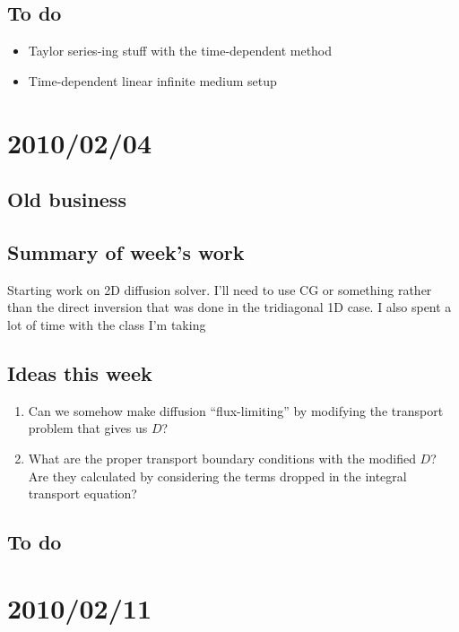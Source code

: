 \documentclass[11pt]{SRJresearch}
\begin{document}
\subsection{To do}
\begin{itemize}
  \item Taylor series-ing stuff with the time-dependent method

  \item Time-dependent linear infinite medium setup
\end{itemize}
\section{2010/02/04}

\subsection{Old business}

\subsection{Summary of week's work}
Starting work on 2D diffusion solver. I'll need to use CG or something rather
than the direct inversion that was done in the tridiagonal 1D case. I also
spent a lot of time with the class I'm taking

\subsection{Ideas this week}
\begin{enumerate}
\item Can we somehow make diffusion ``flux-limiting'' by modifying the transport
problem that gives us $D$?

\item What are the proper transport boundary conditions with the modified $D$?
  Are they calculated by considering the terms dropped in the integral
  transport equation?

\end{enumerate}

\subsection{To do}

\section{2010/02/11}
\end{document}
